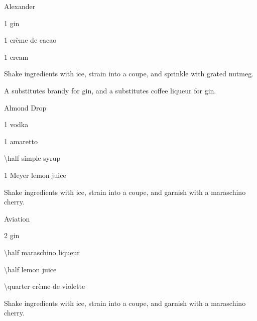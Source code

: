 \begin{Cocktail}{Alexander}
  \begin{Ingredients}
  \item \SI{1}{\oz} gin
  \item \SI{1}{\oz} cr\`{e}me de cacao
  \item \SI{1}{\oz} cream
  \end{Ingredients}
  
  \begin{Instructions}
	Shake ingredients with ice, strain into a coupe, and sprinkle with grated nutmeg.
	
	A  substitutes brandy for gin, and a  substitutes coffee liqueur for gin.
  \end{Instructions}
\end{Cocktail}

\begin{Cocktail*}{Almond Drop}
  \begin{Ingredients}
  \item \SI{1}{\oz} vodka
  \item \SI{1}{\oz} amaretto
  \item \SI{\half}{\oz} simple syrup
  \item \SI{1}{\oz} Meyer lemon juice
  \end{Ingredients}
  
  \begin{Instructions}
	Shake ingredients with ice, strain into a coupe, and garnish with a maraschino cherry.
  \end{Instructions}
\end{Cocktail*}

\begin{Cocktail}{Aviation}
  \begin{Ingredients}
  \item \SI{2}{\oz} gin
  \item \SI{\half}{\oz} maraschino liqueur
  \item \SI{\half}{\oz} lemon juice
  \item \SI{\quarter}{\oz} cr\`{e}me de violette
  \end{Ingredients}
  
  \begin{Instructions}
	Shake ingredients with ice, strain into a coupe, and garnish with a maraschino cherry.
  \end{Instructions}
\end{Cocktail}

